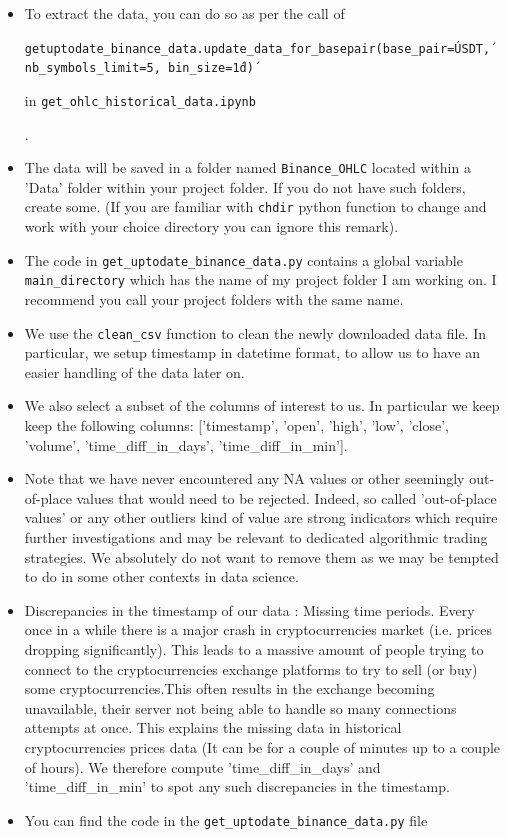 \documentclass[twoside]{report}
\newcommand{\code}{\texttt}
\begin{document}
\begin{spacing}{1}
\begin{itemize}
\item{To extract the data, you can do so as per the call of \begin{center}\code{getuptodate\_binance\_data.update\_data\_for\_basepair(base\_pair=\'USDT\', nb\_symbols\_limit=5, bin\_size=\'1d\')}\end{center} in \code{get\_ohlc\_historical\_data.ipynb}}.

\item{The data will be saved in a folder named \code{Binance\_OHLC} located within a 'Data' folder within your project folder. If you do not have such folders, create some. (If you are familiar with \code{chdir} python function to change and work with your choice directory you can ignore this remark).}

\item{The code in \code{get\_uptodate\_binance\_data.py} contains a global variable \code{main\_directory} which has the name of my project folder I am working on. I recommend you call your project folders with the same name.}
\end{itemize}




\begin{itemize}
    \item 
We use the \code{clean\_csv} function to clean the newly downloaded data file. In particular, we setup timestamp in datetime format, to allow us to have an easier handling of the data later on.
    \item
We also select a subset of the columns of interest to us. In particular we keep keep the following columns: ['timestamp', 'open', 'high', 'low', 'close', 'volume', 'time\_diff\_in\_days', 'time\_diff\_in\_min'].
    \item
Note that we have never encountered any NA values or other seemingly out-of-place values that would need to be rejected. Indeed, so called 'out-of-place values' or any other outliers kind of value are strong indicators which require further investigations and may be relevant to dedicated algorithmic trading strategies. We absolutely do not want to remove them as we may be tempted to do in some other contexts in data science.
    \item
Discrepancies in the timestamp of our data : Missing time periods. Every once in a while there is a major crash in cryptocurrencies market (i.e. prices dropping significantly). This leads to a massive amount of people trying to connect to the cryptocurrencies exchange platforms to try to sell (or buy) some cryptocurrencies.This often results in the exchange becoming unavailable, their server not being able to handle so many connections attempts at once. This explains the missing data in historical cryptocurrencies prices data (It can be for a couple of minutes up to a couple of hours). We therefore compute 'time\_diff\_in\_days' and 'time\_diff\_in\_min' to spot any such discrepancies in the timestamp.
    \item
You can find the code in the \code{get\_uptodate\_binance\_data.py} file


\end{itemize}
\end{spacing}
\end{document}
